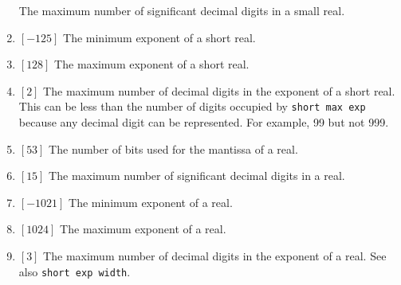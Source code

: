 \begin{enumerate}
The maximum number of significant decimal digits in a small real.
\item {} $[-125]$ \newline
The minimum exponent of a short real.
\item {} $[128]$ \newline
The maximum exponent of a short real.
\item {} $[2]$\newline
The maximum number of decimal digits in the exponent of a short real.
This can be less than the number of digits occupied by
\verb|short max exp| because any decimal digit can be represented. For
example, 99 but not 999.
\item {} $[53]$ \newline
The number of bits used for the mantissa of a real.
\item {}
$[15]$ \newline
The maximum number of significant decimal digits in a real.
\item {} $[-1021]$\newline
The minimum exponent of a real.
\item {} $[1024]$\newline
The maximum exponent of a real.
\item {} $[3]$\newline
The maximum number of decimal digits in the exponent of a real. See
also \verb|short exp width|.
\end{enumerate}

